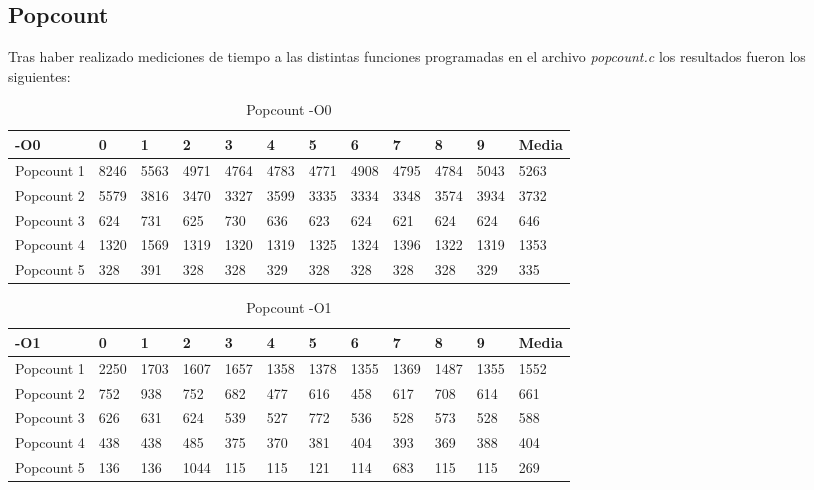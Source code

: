 \newpage

\subsection*{Popcount}

\begin{flushleft}
  Tras haber realizado mediciones de tiempo a las distintas funciones
  programadas en el archivo \textit{popcount.c} los resultados fueron
  los siguientes:
\end{flushleft}

\begin{table}[!htbp]
\centering
\caption{Popcount -O0}
\label{my-label}
\begin{tabular}{|l|l|l|l|l|l|l|l|l|l|l|l|}\hline
-O0        & 0    & 1    & 2    & 3    & 4    & 5    & 6    & 7    & 8    & 9    & Media \\\hline
Popcount 1 & 8246 & 5563 & 4971 & 4764 & 4783 & 4771 & 4908 & 4795 & 4784 & 5043 & 5263  \\\hline
Popcount 2 & 5579 & 3816 & 3470 & 3327 & 3599 & 3335 & 3334 & 3348 & 3574 & 3934 & 3732  \\\hline
Popcount 3 & 624  & 731  & 625  & 730  & 636  & 623  & 624  & 621  & 624  & 624  & 646   \\\hline
Popcount 4 & 1320 & 1569 & 1319 & 1320 & 1319 & 1325 & 1324 & 1396 & 1322 & 1319 & 1353  \\\hline
Popcount 5 & 328  & 391  & 328  & 328  & 329  & 328  & 328  & 328  & 328  & 329  & 335   \\\hline
\end{tabular}
\end{table}

\begin{table}[!htbp]
\centering
\caption{Popcount -O1}
\label{my-label}
\begin{tabular}{|l|l|l|l|l|l|l|l|l|l|l|l|}\hline
-O1        & 0    & 1    & 2    & 3    & 4    & 5    & 6    & 7    & 8    & 9    & Media \\\hline
Popcount 1 & 2250 & 1703 & 1607 & 1657 & 1358 & 1378 & 1355 & 1369 & 1487 & 1355 & 1552  \\\hline
Popcount 2 & 752  & 938  & 752  & 682  & 477  & 616  & 458  & 617  & 708  & 614  & 661   \\\hline
Popcount 3 & 626  & 631  & 624  & 539  & 527  & 772  & 536  & 528  & 573  & 528  & 588   \\\hline
Popcount 4 & 438  & 438  & 485  & 375  & 370  & 381  & 404  & 393  & 369  & 388  & 404   \\\hline
Popcount 5 & 136  & 136  & 1044 & 115  & 115  & 121  & 114  & 683  & 115  & 115  & 269   \\\hline
\end{tabular}
\end{table}

